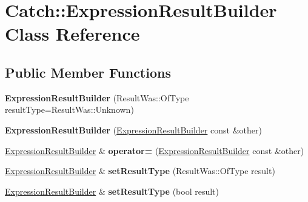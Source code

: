 \hypertarget{classCatch_1_1ExpressionResultBuilder}{}\section{Catch\+:\+:Expression\+Result\+Builder Class Reference}
\label{classCatch_1_1ExpressionResultBuilder}
\subsection*{Public Member Functions}
\begin{DoxyCompactItemize}
\item 
{\bfseries Expression\+Result\+Builder} (Result\+Was\+::\+Of\+Type result\+Type=Result\+Was\+::\+Unknown)\hypertarget{classCatch_1_1ExpressionResultBuilder_a315f8bfd20dff134f82eae5ca2270c79}{}\label{classCatch_1_1ExpressionResultBuilder_a315f8bfd20dff134f82eae5ca2270c79}

\item 
{\bfseries Expression\+Result\+Builder} (\hyperlink{classCatch_1_1ExpressionResultBuilder}{Expression\+Result\+Builder} const \&other)\hypertarget{classCatch_1_1ExpressionResultBuilder_a6ec5755b27a2b6c6b1e37dae83c5d5ba}{}\label{classCatch_1_1ExpressionResultBuilder_a6ec5755b27a2b6c6b1e37dae83c5d5ba}

\item 
\hyperlink{classCatch_1_1ExpressionResultBuilder}{Expression\+Result\+Builder} \& {\bfseries operator=} (\hyperlink{classCatch_1_1ExpressionResultBuilder}{Expression\+Result\+Builder} const \&other)\hypertarget{classCatch_1_1ExpressionResultBuilder_a3f4926aa71d8e4a6f1069b664cd677d2}{}\label{classCatch_1_1ExpressionResultBuilder_a3f4926aa71d8e4a6f1069b664cd677d2}

\item 
\hyperlink{classCatch_1_1ExpressionResultBuilder}{Expression\+Result\+Builder} \& {\bfseries set\+Result\+Type} (Result\+Was\+::\+Of\+Type result)\hypertarget{classCatch_1_1ExpressionResultBuilder_ac6e748b2aaf7a13945dffc363123975b}{}\label{classCatch_1_1ExpressionResultBuilder_ac6e748b2aaf7a13945dffc363123975b}

\item 
\hyperlink{classCatch_1_1ExpressionResultBuilder}{Expression\+Result\+Builder} \& {\bfseries set\+Result\+Type} (bool result)\hypertarget{classCatch_1_1ExpressionResultBuilder_af3e2ba84cc7a0cfb892b00fc5ea7553f}{}\label{classCatch_1_1ExpressionResultBuilder_af3e2ba84cc7a0cfb892b00fc5ea7553f}


\end{DoxyCompactItemize}

